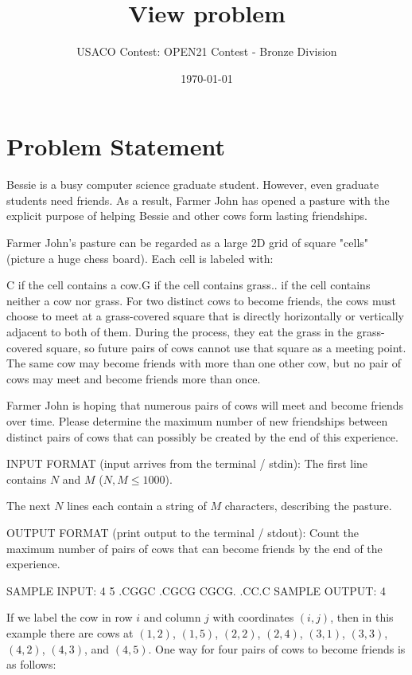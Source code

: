 \documentclass[12pt]{article}
\title{View problem}
\author{USACO Contest: OPEN21 Contest - Bronze Division}
\date{\today}
\begin{document}
\maketitle

\section*{Problem Statement}

Bessie is a busy computer science graduate student. However, even graduate
students need friends. As a result, Farmer John has opened a pasture with the
explicit purpose of helping Bessie and other cows form lasting friendships.

Farmer John's pasture can be regarded as a large 2D grid of square "cells"
(picture a huge chess board). Each cell is labeled with:

C if the cell contains a cow.G if the cell contains grass.. if the cell contains neither a cow nor grass.
For two distinct cows to become friends, the cows must choose to meet at  a
grass-covered square that is directly horizontally or vertically adjacent  to
both of them.  During the process, they eat the grass in the grass-covered
square, so future pairs of cows cannot use that square as a meeting point. The
same cow may become friends with more than one other cow,  but no pair of cows
may meet and become friends more than once.

Farmer John is hoping that numerous pairs of cows will meet and become friends
over time.  Please determine the maximum number of new friendships between
distinct pairs of cows that can possibly be created by the end of this
experience.

INPUT FORMAT (input arrives from the terminal / stdin):
The first line contains $N$ and $M$ ($N,M \leq 1000$).

The next $N$ lines each contain a string of $M$ characters, describing the pasture.

OUTPUT FORMAT (print output to the terminal / stdout):
Count the maximum number of pairs of cows that can become friends by the end
of the experience.

SAMPLE INPUT:
4 5
.CGGC
.CGCG
CGCG.
.CC.C
SAMPLE OUTPUT: 
4

If we label the cow in row $i$ and column $j$ with coordinates $(i,j)$, then in
this example there are cows at $(1,2)$, $(1,5)$, $(2,2)$, $(2,4)$, $(3,1)$, $(3,3)$, $(4,2)$,
$(4,3)$, and $(4,5)$. One way for four pairs of cows to become friends is as
follows:
\end{document}
